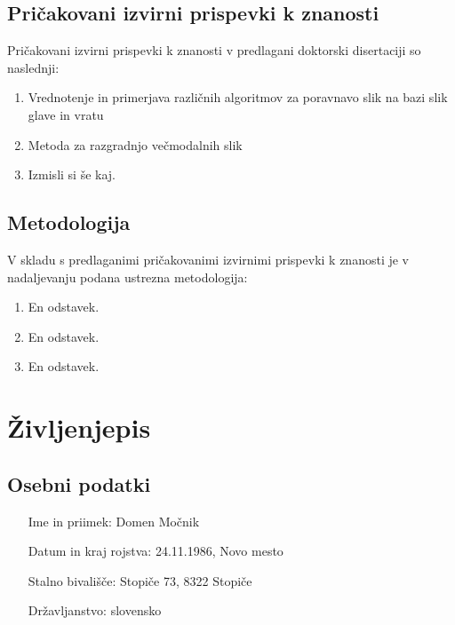 \documentclass[a4paper,twoside,11pt]{article}
\begin{document}
	\subsection{Pričakovani izvirni prispevki k znanosti}
	\par{\noindent
		Pričakovani izvirni prispevki k znanosti v predlagani doktorski disertaciji so naslednji:
		\begin{enumerate}
			\item Vrednotenje in primerjava različnih algoritmov za poravnavo slik na bazi slik glave in vratu
			\item Metoda za razgradnjo večmodalnih slik
			\item Izmisli si še kaj.

		\end{enumerate}
	}
	\subsection{Metodologija}
	\par{\noindent
		V skladu s predlaganimi pričakovanimi izvirnimi prispevki k znanosti je v nadaljevanju podana ustrezna metodologija:
		\begin{enumerate}
			\item En odstavek.
			\item En odstavek.
			\item En odstavek.
			
		\end{enumerate}
	}
	\renewcommand{\bibsection}{\subsection{Izbrana literatura}}
	
	\newpage
	\newpage
	\section{Življenjepis}
	
	\subsection*{Osebni podatki}
	\begin{itemize}[align=left, itemsep=-0.1cm, leftmargin=4.25cm, labelwidth=*]
		\item[Ime in priimek:] Domen Močnik
		\item[Datum in kraj rojstva:] 24.11.1986, Novo mesto
		\item[Stalno bivališče:] Stopiče 73, 8322 Stopiče
		\item[Državljanstvo:] slovensko
	\end{itemize}
	
\end{document}
